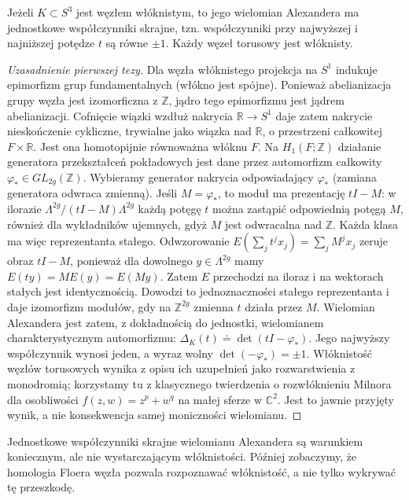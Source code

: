 \begin{twierdzenie}
Jeżeli $K\subset S^3$ jest węzłem włóknistym, to jego
wielomian Alexandera ma jednostkowe współczynniki skrajne,
tzn. współczynniki przy najwyższej i najniższej potędze
$t$ są równe $\pm1$. Każdy węzeł torusowy jest włóknisty.
\end{twierdzenie}

\begin{proof}[Uzasadnienie pierwszej tezy]
Dla węzła włóknistego projekcja na $S^1$ indukuje
epimorfizm grup fundamentalnych (włókno jest spójne).
Ponieważ abelianizacja grupy węzła jest izomorficzna
z $\mathbb Z$, jądro tego epimorfizmu jest jądrem
abelianizacji. Cofnięcie wiązki wzdłuż nakrycia
$\mathbb R\to S^1$ daje zatem nakrycie nieskończenie
cykliczne, trywialne jako wiązka nad $\mathbb R$,
o przestrzeni całkowitej $F\times\mathbb R$.
Jest ona homotopijnie równoważna włóknu $F$.
Na $H_1(F;\mathbb Z)$ działanie generatora przekształceń
pokładowych jest dane przez automorfizm całkowity
$\varphi_*\in GL_{2g}(\mathbb Z)$. Wybieramy generator nakrycia odpowiadający $\varphi_*$
(zamiana generatora odwraca zmienną).
Jeśli $M=\varphi_*$, to moduł ma prezentację $tI-M$:
w ilorazie $\Lambda^{2g}/(tI-M)\Lambda^{2g}$
każdą potęgę $t$ można zastąpić odpowiednią potęgą $M$,
również dla wykładników ujemnych, gdyż $M$ jest odwracalna
nad $\mathbb Z$. Każda klasa ma więc reprezentanta
stałego. Odwzorowanie
$E(\sum_jt^jx_j)=\sum_j M^jx_j$
zeruje obraz $tI-M$, ponieważ dla dowolnego $y\in\Lambda^{2g}$
mamy $E(ty)=ME(y)=E(My)$. Zatem $E$ przechodzi
na iloraz i na wektorach stałych jest identycznością.
Dowodzi to jednoznaczności stałego reprezentanta
i daje izomorfizm modułów, gdy na $\mathbb Z^{2g}$
zmienna $t$ działa przez $M$.
Wielomian Alexandera jest zatem, z dokładnością do
jednostki, wielomianem charakterystycznym automorfizmu:
$\Delta_K(t)\doteq\det(tI-\varphi_*)$.
Jego najwyższy współczynnik wynosi jeden, a wyraz wolny
$\det(-\varphi_*)=\pm1$. Włóknistość węzłów torusowych
wynika z opisu ich uzupełnień jako rozwarstwienia z monodromią;
korzystamy tu z klasycznego twierdzenia o rozwłóknieniu
Milnora dla osobliwości $f(z,w)=z^p+w^q$ na małej
sferze w $\mathbb C^2$. Jest to jawnie przyjęty wynik,
a nie konsekwencja samej moniczności wielomianu.
\end{proof}

\begin{uwaga}
Jednostkowe współczynniki skrajne wielomianu Alexandera
są warunkiem koniecznym, ale nie wystarczającym włóknistości. Później zobaczymy, że
homologia Floera węzła pozwala rozpoznawać włóknistość,
a nie tylko wykrywać tę przeszkodę.
\end{uwaga}



